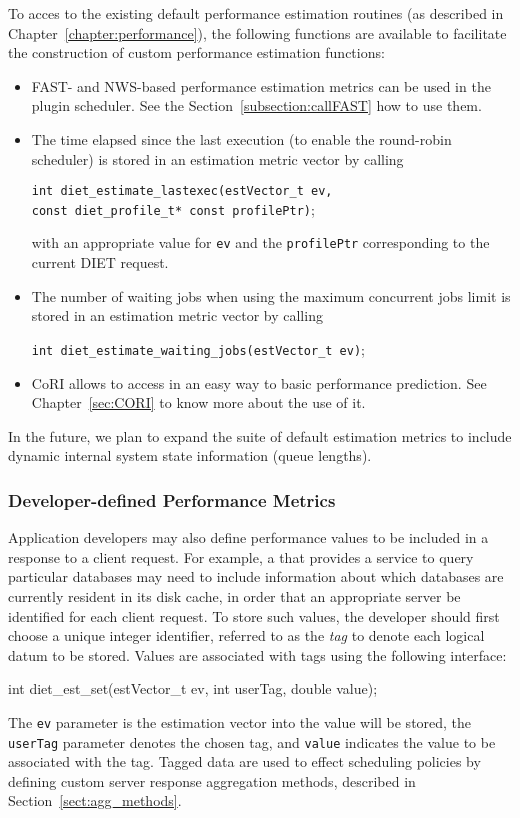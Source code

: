 To acces to the existing default performance estimation
routines (as described in Chapter~\ref{chapter:performance}), the following
functions are available to facilitate the construction of custom
performance estimation functions:
\begin{itemize}
\item FAST- and NWS-based performance estimation metrics can be used in the plugin scheduler. 
See the Section~\ref{subsection:callFAST} how to use them.
\item The time elapsed since the last execution (to enable
  the round-robin scheduler) is stored in an estimation metric vector
  by calling
  \begin{tabbing}
    \texttt{int diet\_estimate\_lastexec(}\=\texttt{estVector\_t ev,} \\
    \> \texttt{const diet\_profile\_t* const profilePtr)};
  \end{tabbing}
  with an appropriate value for \texttt{ev} and the
  \texttt{profilePtr} corresponding to the current DIET request.
\item The number of waiting jobs when using the maximum concurrent jobs
  limit is stored in an estimation metric vector by calling
  \begin{tabbing}
    \texttt{int diet\_estimate\_waiting\_jobs(}\=\texttt{estVector\_t ev)};
  \end{tabbing}
\item CoRI allows to access in an easy way to basic performance 
prediction. See Chapter~\ref{sec:CORI} to know more about the use of it.

\end{itemize}

In the future, we plan to expand the suite of default estimation
metrics to include dynamic internal \diet system state information
(\eg queue lengths).

\subsubsection{Developer-defined Performance Metrics}

Application developers may also define performance values to be
included in a \sed response to a client request.  For example, a \diet
\sed that provides a service to query particular databases may need to
include information about which databases are currently resident in
its disk cache, in order that an appropriate server be identified for
each client request.  To store such values, the \sed developer should
first choose a unique integer identifier, referred to as the
\emph{tag} to denote each logical datum to be stored.  Values are
associated with tags using the following interface:
\begin{code}
int diet\_est\_set(estVector\_t ev, int userTag, double value);
\end{code}
The \texttt{ev} parameter is the estimation vector into the
value will be stored, the \texttt{userTag} parameter denotes the
chosen tag, and \texttt{value} indicates the value to be associated
with the tag.  Tagged data are used to effect
scheduling policies by defining custom server response
aggregation methods, described in Section~\ref{sect:agg_methods}.

